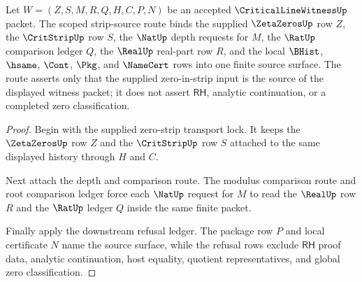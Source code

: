 \begin{theorem}
\label{thm:critical-line-witness-scoped-strip-source}
Let $W=(Z,S,M,R,Q,H,C,P,N)$ be an accepted $\CriticalLineWitnessUp$ packet. The
scoped strip-source route binds the supplied $\ZetaZerosUp$ row $Z$, the
$\CritStripUp$ row $S$, the $\NatUp$ depth requests for $M$, the $\RatUp$
comparison ledger $Q$, the $\RealUp$ real-part row $R$, and the local
$\BHist$, $\hsame$, $\Cont$, $\Pkg$, and $\NameCert$ rows into one finite source
surface. The route asserts only that the supplied zero-in-strip input is the
source of the displayed witness packet; it does not assert $\mathsf{RH}$,
analytic continuation, or a completed zero classification.
\end{theorem}
\begin{proof}
Begin with the supplied zero-strip transport lock. It keeps the $\ZetaZerosUp$
row $Z$ and the $\CritStripUp$ row $S$ attached to the same displayed history
through $H$ and $C$.

Next attach the depth and comparison route. The modulus comparison route and
root comparison ledger force each $\NatUp$ request for $M$ to read the $\RealUp$
row $R$ and the $\RatUp$ ledger $Q$ inside the same finite packet.

Finally apply the downstream refusal ledger. The package row $P$ and local
certificate $N$ name the source surface, while the refusal rows exclude
$\mathsf{RH}$ proof data, analytic continuation, host equality, quotient
representatives, and global zero classification.
\end{proof}

